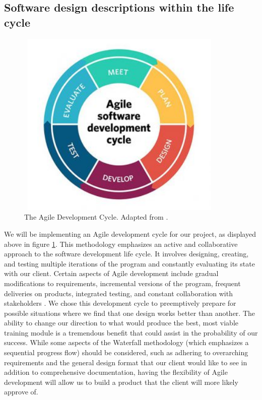 \documentclass[onecolumn, draftclsnofoot,10pt, compsoc]{IEEEtran}
\begin{document}
\subsection{Software design descriptions within the life cycle}
\begin{center}
    \begin{figure}[h]
        \centering
        \includegraphics[width=10cm, height=9cm]{agile.jpg}
        \caption{The Agile Development Cycle. Adapted from \cite{1}.}
        \label{fig:mesh1}
    \end{figure}
\end{center}

We will be implementing an Agile development cycle for our project, as displayed above in  figure \ref{fig:mesh1}. This methodology emphasizes an active and collaborative approach to the software development life cycle. It involves designing, creating, and testing multiple iterations of the program and constantly evaluating its state with our client. Certain aspects of Agile development include gradual modifications to requirements, incremental versions of the program, frequent deliveries on products, integrated testing, and constant collaboration with stakeholders \cite{1}. We chose this development cycle to preemptively prepare for possible situations where we find that one design works better than another. The ability to change our direction to what would produce the best, most viable training module is a tremendous benefit that could assist in the probability of our success. While some aspects of the Waterfall methodology (which emphasizes a sequential progress flow) should be considered, such as adhering to overarching requirements and the general design format that our client would like to see in addition to comprehensive documentation, having the flexibility of Agile development will allow us to build a product that the client will more likely approve of.  
\end{document}

